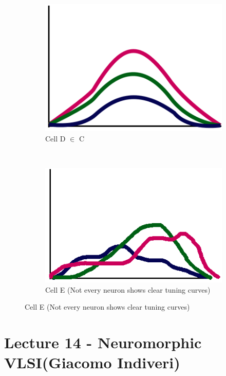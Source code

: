 \documentclass[english,11pt]{article}
\begin{document}
\begin{figure}[H]
        \centering
        \begin{subfigure}[b]{0.3\textwidth}
                \centering
				\includegraphics[width=\textwidth]{Cell-D.png}
                \caption{Cell D $\in$ C}
        \end{subfigure}%
        ~
        \begin{subfigure}[b]{0.3\textwidth}
                \centering
				\includegraphics[width=\textwidth]{Cell-E.png}
                \caption{Cell E (Not every neuron shows clear tuning curves)}
        \end{subfigure}
\end{figure}

\section{Lecture 14 - Neuromorphic VLSI(Giacomo Indiveri)}
\end{document}
